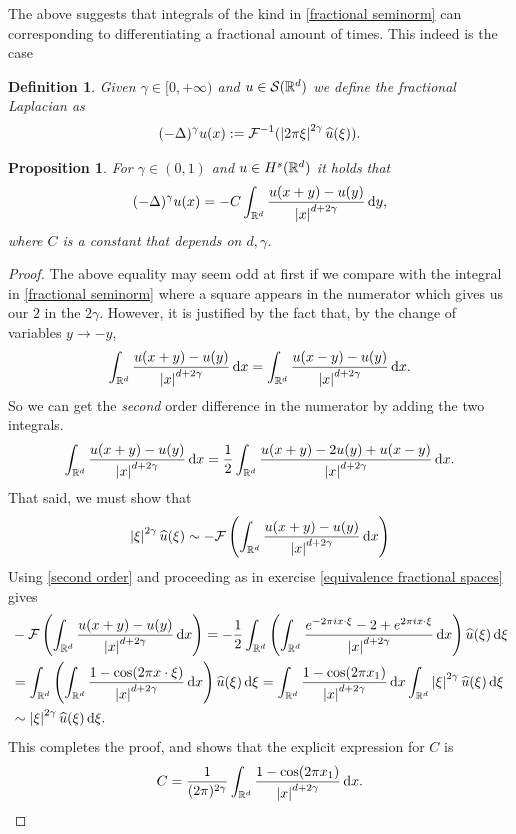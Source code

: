 \documentclass[12pt]{article}
\newtheorem{proposition}[theorem]{Proposition}
\newtheorem{definition}[theorem]{Definition}
\theoremstyle{definition}
\renewcommand{\d}{\,\mathrm{d}}
\begin{document}
The above suggests that integrals of the kind in \eqref{fractional seminorm} can corresponding to differentiating a fractional amount of times. This indeed is the case
\begin{definition}
	Given $\gamma  \in [0,+\infty)$ and $u \in \mathcal{S} (\mathbb{R}^d)$ we define the fractional Laplacian as
	\begin{align*}
		(-\Delta )^{\gamma }u(x):= \mathcal{F}^{-1}(\left| 2\pi\xi \right|^{2\gamma }\widehat{u}(\xi )).
	\end{align*}
\end{definition}
\begin{proposition}
	For $\gamma  \in (0,1)$ and $u \in H^s(\mathbb{R}^d)$ it holds that
	\begin{align*}
		(-\Delta )^{\gamma }u(x)=-C\int_{\R^d}\frac{u(x+y)-u(y)}{\abs{x}^{d+2\gamma}}\d y,
	\end{align*}
	where $C$ is a constant that depends on $d,\gamma $.
\end{proposition}
\begin{proof}
	The above equality may seem odd at first if we compare with the integral in \eqref{fractional seminorm} where a square appears in the numerator which gives us our $2$  in the $2 \gamma $. However, it is justified by the fact that, by the change of variables $y \to -y$,
	\begin{align*}
		\int_{\R^d}\frac{u(x+y)-u(y)}{\abs{x}^{d+2\gamma}}\d x=\int_{\R^d}\frac{u(x-y)-u(y)}{\abs{x}^{d+2\gamma}}\d x.
	\end{align*}
	So we can get the \emph{second} order difference in the numerator by adding the two integrals.
	\begin{align}\label{second order}
		\int_{\R^d}\frac{u(x+y)-u(y)}{\abs{x}^{d+2\gamma}}\d x=\frac{1}{2}\int_{\R^d}\frac{u(x+y)-2u(y)+u(x-y)}{\abs{x}^{d+2\gamma}}\d x.
	\end{align}
	That said, we must show that
	\begin{align*}
		\abs{\xi}^{2\gamma }\wh{u}(\xi )\sim -\Ff \left(\int_{\R^d}\frac{u(x+y)-u(y)}{\abs{x}^{d+2\gamma}}\d x\right)
	\end{align*}
	Using \eqref{second order} and proceeding as in exercise \ref{equivalence fractional spaces} gives
	\begin{align*}
		 & -\Ff \left(\int_{\R^d}\frac{u(x+y)-u(y)}{\abs{x}^{d+2\gamma}}\d x\right)= -\frac{1}{2} \int_{\R^d}\left(\int_{\R^d}\frac{e^{-2\pi i x \cdot \xi}-2+e^{2\pi i x \cdot \xi}}{\abs{x}^{d+2\gamma}}\d x\right) \wh{u}(\xi)\d \xi      \\
		 & =\int_{\R^d}\left(\int_{\R^d}\frac{1-\cos(2\pi x \cdot \xi)}{\abs{x}^{d+2\gamma}}\d x\right) \wh{u}(\xi)\d \xi =\int_{\R^d}  \frac{1-\cos(2\pi  x_1) }{\abs{x}^{d+2\gamma	}}\d x\int_{\R^d}\abs{\xi}^{2 \gamma }\wh{u}(\xi)\d \xi \\& \sim \abs{\xi}^{2 \gamma }\wh{u}(\xi)\d \xi.
	\end{align*}
	This completes the proof, and shows that the explicit expression for $C$ is
	\begin{align*}
		C=\frac{1}{(2\pi)^{2 \gamma }}\int_{\R^d}  \frac{1-\cos(2\pi  x_1) }{\abs{x}^{d+2\gamma	}}\d x.
	\end{align*}
\end{proof}
\end{document}
